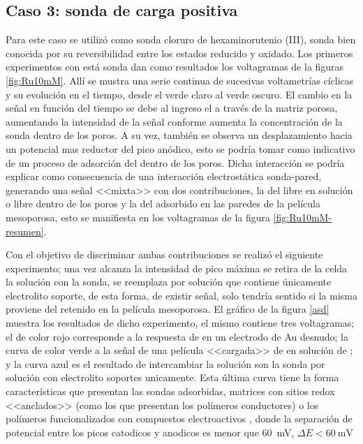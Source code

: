 	\subsection{Caso 3: sonda de carga positiva}

		Para este caso se utilizó como sonda cloruro de hexaminorutenio (III), sonda bien conocida por su reversibilidad entre los estados reducido y oxidado. Los primeros experimentos con está sonda dan como resultados los voltagramas de la figuras \ref{fig:Ru10mM}. Allí se mustra una serie continua de sucesivas voltametrías cíclicas y su evolución en el tiempo, desde el verde claro al verde oscuro. El cambio en la señal en función del tiempo se debe al ingreso el \aminorutenio\space a través de la matriz porosa, aumentando la intensidad de la señal conforme aumenta la concentración de la sonda dentro de los poros. A su vez, también se observa un desplazamiento hacia un potencial mas reductor del pico anódico, esto se podría tomar como indicativo de un proceso de adsorción del \aminorutenio\space dentro de los poros. Dicha interacción se podría explicar como consecuencia de una interacción electrostática sonda-pared, generando una señal <<mixta>> con dos contribuciones, la del \aminorutenio\space libre en solución o libre dentro de los poros y la del adsorbido en las paredes de la película mesoporosa, esto se manifiesta en los voltagramas de la figura \ref{fig:Ru10mM-resumen}.

		Con el objetivo de discriminar ambas contribuciones se realizó el siguiente experimento; una vez alcanza la intensidad de pico máxima se retira de la celda la solución con la sonda, se reemplaza por solución que contiene únicamente electrolito soporte, de esta forma, de existir señal, solo tendría sentido si la misma proviene del \aminorutenio\space retenido en la película mesoporosa. El gráfico de la figura \ref{asd} muestra los resultados de dicho experimento, el mismo contiene tres voltagramas; el de color rojo corresponde a la respuesta de \aminorutenio\space en un electrodo de Au desnudo; la curva de color verde a la señal de una película <<cargada>> de \aminorutenio\space en solución de \aminorutenio; y la curva azul es el resultado de intercambiar la solución son la sonda por solución con electrolito soportes unicamente. Esta última curva tiene la forma características que presentan las sondas adsorbidas, matrices con sitios redox <<anclados>>\cite{Ybarra2005} (como los que presentan los polímeros conductores) o los polímeros funcionalizados con compuestos electroactivos \cite{Rohlfing2005,Vila2015}, donde la separación de potencial entre los picos catodicos y anodicos es menor que \SI{60}{\milli\volt}, $\Delta E < \SI{60}{\milli\volt}$ 

